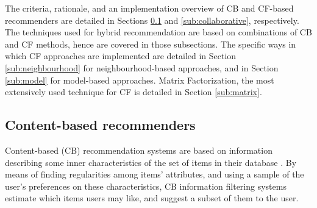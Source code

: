 The criteria, rationale, and an implementation overview of CB and CF-based recommenders are detailed in Sections \ref{sub:content} and \ref{sub:collaborative}, respectively. The techniques used for hybrid recommendation are based on combinations of CB and CF methods, hence are covered in those subsections. 
The specific ways in which CF approaches are implemented are detailed in Section \ref{sub:neighbourhood} for neighbourhood-based approaches, and in Section \ref{sub:model} for model-based approaches. Matrix Factorization, the most extensively used technique for CF is detailed in Section \ref{sub:matrix}.




\subsection{Content-based recommenders}\label{sub:content}
Content-based (CB) recommendation systems are based on information describing some inner characteristics of the set of items in their database \autocite{basu98recommendation}. 
By means of finding regularities among items' attributes, and using a sample of the user's preferences on these characteristics, CB information filtering systems estimate which items users may like, and suggest a subset of them to the user. 




